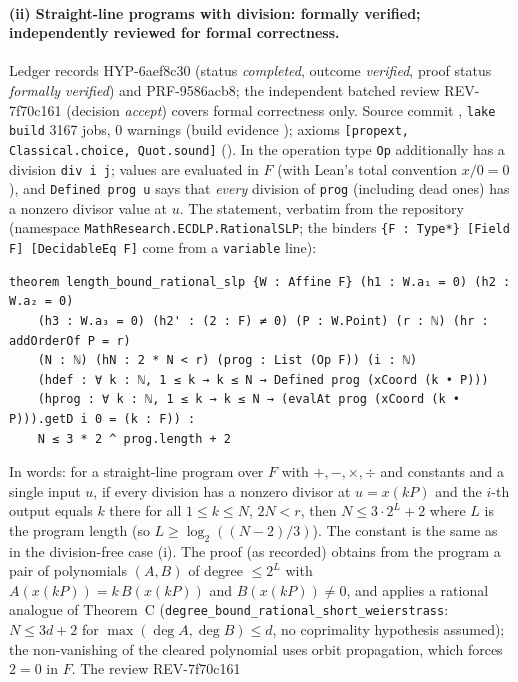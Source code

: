 \documentclass[11pt,a4paper]{article}
\theoremstyle{remark}
\begin{document}
\paragraph{(ii) Straight-line programs with division: formally verified; independently reviewed for formal correctness.}
Ledger records \mbox{HYP-6aef8c30} (status \emph{completed}, outcome \emph{verified}, proof status \emph{formally verified}) and \mbox{PRF-9586acb8}; the independent batched review
\mbox{REV-7f70c161} (decision \emph{accept}) covers formal correctness only. Source commit , \texttt{lake build} 3167 jobs, 0 warnings
(build evidence );
axioms \texttt{[propext, Classical.choice, Quot.sound]} ().
In  the operation type \texttt{Op} additionally has a division \texttt{div i j}; values are evaluated in $F$ (with Lean's total convention $x/0=0$),
and \texttt{Defined prog u} says that \emph{every} division of \texttt{prog} (including dead ones) has a nonzero divisor value at $u$. The statement, verbatim from the repository
(namespace \texttt{MathResearch.ECDLP.RationalSLP}; the binders \texttt{\{F : Type*\} [Field F] [DecidableEq F]} come from a \texttt{variable} line):
\begin{lstlisting}
theorem length_bound_rational_slp {W : Affine F} (h1 : W.a₁ = 0) (h2 : W.a₂ = 0)
    (h3 : W.a₃ = 0) (h2' : (2 : F) ≠ 0) (P : W.Point) (r : ℕ) (hr : addOrderOf P = r)
    (N : ℕ) (hN : 2 * N < r) (prog : List (Op F)) (i : ℕ)
    (hdef : ∀ k : ℕ, 1 ≤ k → k ≤ N → Defined prog (xCoord (k • P)))
    (hprog : ∀ k : ℕ, 1 ≤ k → k ≤ N → (evalAt prog (xCoord (k • P))).getD i 0 = (k : F)) :
    N ≤ 3 * 2 ^ prog.length + 2
\end{lstlisting}
In words: for a straight-line program over $F$ with $+,-,\times,\div$ and constants and a single input $u$, if every division has a nonzero divisor at $u=x(kP)$ and the $i$-th output equals $k$
there for all $1\le k\le N$, $2N<r$, then $N\le 3\cdot2^{L}+2$ where $L$ is the program length (so $L\ge\log_2((N-2)/3)$). The constant is the same as in the division-free case (i).
The proof (as recorded) obtains from the program a pair of polynomials $(A,B)$ of degree $\le 2^L$ with $A(x(kP))=k\,B(x(kP))$ and $B(x(kP))\ne0$, and applies a rational analogue of Theorem~C
(\texttt{degree\_bound\_rational\_short\_weierstrass}: $N\le 3d+2$ for $\max(\deg A,\deg B)\le d$, no coprimality hypothesis assumed); the non-vanishing of the cleared polynomial uses orbit propagation, which forces $2=0$ in $F$. The review \mbox{REV-7f70c161}
\end{document}

